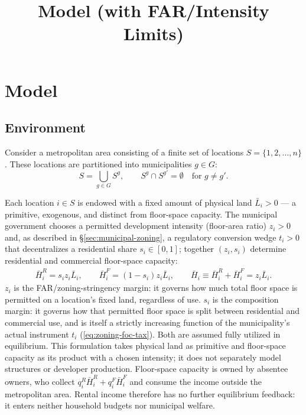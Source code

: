 \documentclass[12pt, a4paper]{article}
\title{Model (with FAR/Intensity Limits)}
\author{}
\date{}
\theoremstyle{definition}
\theoremstyle{remark}
\begin{document}
\maketitle

\section{Model}

\subsection{Environment}
\label{sec:environment}

Consider a metropolitan area consisting of a finite set of locations $S = \{1, 2, \ldots, n\}$. These locations are partitioned into municipalities $g \in G$:
\[
S = \bigcup_{g \in G} S^g, \qquad S^g \cap S^{g'} = \emptyset \quad \text{for } g \neq g'.
\]

Each location $i \in S$ is endowed with a fixed amount of physical land $\bar L_i>0$ — a primitive, exogenous, and distinct from floor-space capacity. The municipal government chooses a permitted development intensity (floor-area ratio) $z_i>0$ and, as described in \S\ref{sec:municipal-zoning}, a regulatory conversion wedge $t_i>0$ that decentralizes a residential share $s_i\in[0,1]$; together $(z_i,s_i)$ determine residential and commercial floor-space capacity:
\begin{align}
    \label{eq:capacity-identity}
    \bar H_i^R=s_iz_i\bar L_i,
    \qquad
    \bar H_i^F=(1-s_i)z_i\bar L_i,
    \qquad
    \bar H_i\equiv\bar H_i^R+\bar H_i^F=z_i\bar L_i.
\end{align}
$z_i$ is the FAR/zoning-stringency margin: it governs how much total floor space is permitted on a location's fixed land, regardless of use. $s_i$ is the composition margin: it governs how that permitted floor space is split between residential and commercial use, and is itself a strictly increasing function of the municipality's actual instrument $t_i$ (\eqref{eq:zoning-foc-tax}). Both are assumed fully utilized in equilibrium. This formulation takes physical land as primitive and floor-space capacity as its product with a chosen intensity; it does not separately model structures or developer production. Floor-space capacity is owned by absentee owners, who collect $q_i^R\bar H_i^R+q_i^F\bar H_i^F$ and consume the income outside the metropolitan area. Rental income therefore has no further equilibrium feedback: it enters neither household budgets nor municipal welfare.
\end{document}
